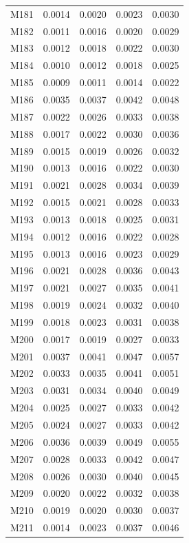 \begin{longtable}{lrrrr}
M181 & 0.0014 & 0.0020 & 0.0023 & 0.0030 \\
M182 & 0.0011 & 0.0016 & 0.0020 & 0.0029 \\
M183 & 0.0012 & 0.0018 & 0.0022 & 0.0030 \\
M184 & 0.0010 & 0.0012 & 0.0018 & 0.0025 \\
M185 & 0.0009 & 0.0011 & 0.0014 & 0.0022 \\
M186 & 0.0035 & 0.0037 & 0.0042 & 0.0048 \\
M187 & 0.0022 & 0.0026 & 0.0033 & 0.0038 \\
M188 & 0.0017 & 0.0022 & 0.0030 & 0.0036 \\
M189 & 0.0015 & 0.0019 & 0.0026 & 0.0032 \\
M190 & 0.0013 & 0.0016 & 0.0022 & 0.0030 \\
M191 & 0.0021 & 0.0028 & 0.0034 & 0.0039 \\
M192 & 0.0015 & 0.0021 & 0.0028 & 0.0033 \\
M193 & 0.0013 & 0.0018 & 0.0025 & 0.0031 \\
M194 & 0.0012 & 0.0016 & 0.0022 & 0.0028 \\
M195 & 0.0013 & 0.0016 & 0.0023 & 0.0029 \\
M196 & 0.0021 & 0.0028 & 0.0036 & 0.0043 \\
M197 & 0.0021 & 0.0027 & 0.0035 & 0.0041 \\
M198 & 0.0019 & 0.0024 & 0.0032 & 0.0040 \\
M199 & 0.0018 & 0.0023 & 0.0031 & 0.0038 \\
M200 & 0.0017 & 0.0019 & 0.0027 & 0.0033 \\
M201 & 0.0037 & 0.0041 & 0.0047 & 0.0057 \\
M202 & 0.0033 & 0.0035 & 0.0041 & 0.0051 \\
M203 & 0.0031 & 0.0034 & 0.0040 & 0.0049 \\
M204 & 0.0025 & 0.0027 & 0.0033 & 0.0042 \\
M205 & 0.0024 & 0.0027 & 0.0033 & 0.0042 \\
M206 & 0.0036 & 0.0039 & 0.0049 & 0.0055 \\
M207 & 0.0028 & 0.0033 & 0.0042 & 0.0047 \\
M208 & 0.0026 & 0.0030 & 0.0040 & 0.0045 \\
M209 & 0.0020 & 0.0022 & 0.0032 & 0.0038 \\
M210 & 0.0019 & 0.0020 & 0.0030 & 0.0037 \\
M211 & 0.0014 & 0.0023 & 0.0037 & 0.0046 \\

\end{longtable}
